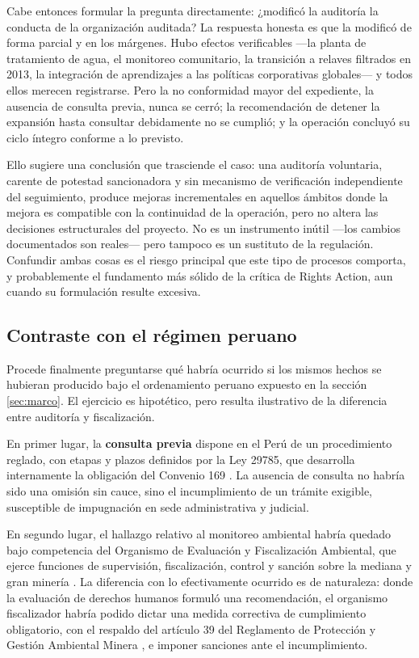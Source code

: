 Cabe entonces formular la pregunta directamente: ¿modificó la auditoría la
conducta de la organización auditada? La respuesta honesta es que la modificó de
forma parcial y en los márgenes. Hubo efectos verificables —la planta de
tratamiento de agua, el monitoreo comunitario, la transición a relaves filtrados en
2013, la integración de aprendizajes a las políticas corporativas globales— y
todos ellos merecen registrarse. Pero la no conformidad mayor del expediente, la
ausencia de consulta previa, nunca se cerró; la recomendación de detener la
expansión hasta consultar debidamente no se cumplió; y la operación concluyó su
ciclo íntegro conforme a lo previsto.

Ello sugiere una conclusión que trasciende el caso: una auditoría voluntaria,
carente de potestad sancionadora y sin mecanismo de verificación independiente del
seguimiento, produce mejoras incrementales en aquellos ámbitos donde la mejora es
compatible con la continuidad de la operación, pero no altera las decisiones
estructurales del proyecto. No es un instrumento inútil —los cambios documentados
son reales— pero tampoco es un sustituto de la regulación. Confundir ambas cosas
es el riesgo principal que este tipo de procesos comporta, y probablemente el
fundamento más sólido de la crítica de Rights Action, aun cuando su formulación
resulte excesiva.

\subsection{Contraste con el régimen peruano}

Procede finalmente preguntarse qué habría ocurrido si los mismos hechos se
hubieran producido bajo el ordenamiento peruano expuesto en la sección
\ref{sec:marco}. El ejercicio es hipotético, pero resulta ilustrativo de la
diferencia entre auditoría y fiscalización.

En primer lugar, la \textbf{consulta previa} dispone en el Perú de un
procedimiento reglado, con etapas y plazos definidos por la Ley 29785, que
desarrolla internamente la obligación del Convenio 169
\parencite{congreso2011ley29785}. La ausencia de consulta no habría sido una
omisión sin cauce, sino el incumplimiento de un trámite exigible, susceptible de
impugnación en sede administrativa y judicial.

En segundo lugar, el hallazgo relativo al monitoreo ambiental habría quedado bajo
competencia del Organismo de Evaluación y Fiscalización Ambiental, que ejerce
funciones de supervisión, fiscalización, control y sanción sobre la mediana y
gran minería \parencite{congreso2009ley29325}. La diferencia con lo efectivamente
ocurrido es de naturaleza: donde la evaluación de derechos humanos formuló una
recomendación, el organismo fiscalizador habría podido dictar una medida
correctiva de cumplimiento obligatorio, con el respaldo del artículo 39 del
Reglamento de Protección y Gestión Ambiental Minera
\parencite{minem2014ds040}, e imponer sanciones ante el incumplimiento.

